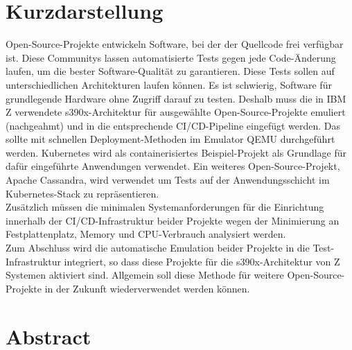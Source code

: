 \thispagestyle{empty}
\section*{Kurzdarstellung}
\label{sec:kurzdarstellung}
Open-Source-Projekte entwickeln Software, bei der der Quellcode frei verfügbar ist. Diese Communitys lassen automatisierte Tests gegen jede Code-Änderung laufen, um die bester Software-Qualität zu garantieren. 
Diese Tests sollen auf unterschiedlichen Architekturen laufen können. Es ist schwierig, Software für grundlegende Hardware ohne Zugriff darauf zu testen. Deshalb muss die in IBM Z verwendete s390x-Architektur für ausgewählte Open-Source-Projekte emuliert (nachgeahmt) und in die entsprechende CI/CD-Pipeline eingefügt werden. 
Das sollte mit schnellen Deployment-Methoden im Emulator QEMU durchgeführt werden. 
Kubernetes wird als containerisiertes Beispiel-Projekt als Grundlage für dafür eingeführte Anwendungen verwendet. Ein weiteres Open-Source-Projekt, Apache Cassandra, wird verwendet um Tests auf der Anwendungsschicht im Kubernetes-Stack zu repräsentieren. \\
Zusätzlich müssen die minimalen Systemanforderungen für die Einrichtung innerhalb der CI/CD-Infrastruktur beider Projekte wegen der Minimierung an Festplattenplatz, Memory und CPU-Verbrauch analysiert werden. \\
Zum Abschluss wird die automatische Emulation beider Projekte in die Test-Infrastruktur integriert, so dass diese Projekte für die s390x-Architektur von Z Systemen aktiviert sind. Allgemein soll diese Methode für weitere Open-Source-Projekte in der Zukunft wiederverwendet werden können.



\section*{Abstract}
\label{sec:abstract}

